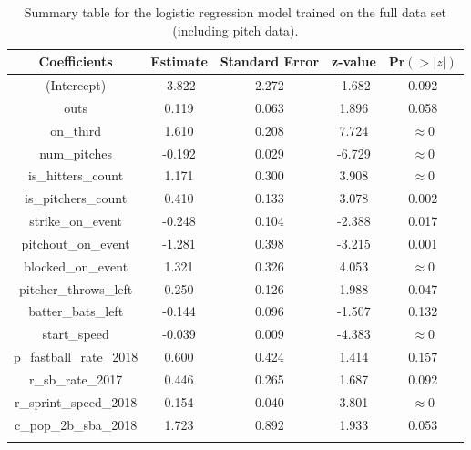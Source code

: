 \documentclass{article}
\begin{document}
\begin{longtable}{c c c c c}
    \hline
    Coefficients & Estimate & Standard Error & z-value & Pr$(>|z|)$ \\
    \hline
    (Intercept) & -3.822 & 2.272 & -1.682 & 0.092 \\
    outs & 0.119 & 0.063 & 1.896 & 0.058 \\
    on\_third & 1.610 & 0.208 & 7.724 & $\approx 0$ \\
    num\_pitches & -0.192 & 0.029 & -6.729 & $\approx 0$ \\
    is\_hitters\_count & 1.171 & 0.300 & 3.908 & $\approx 0$ \\
    is\_pitchers\_count & 0.410 & 0.133 & 3.078 & 0.002 \\
    strike\_on\_event & -0.248 & 0.104 & -2.388 & 0.017 \\
    pitchout\_on\_event & -1.281 & 0.398 & -3.215 & 0.001 \\
    blocked\_on\_event & 1.321 & 0.326 & 4.053 & $\approx 0$ \\
    pitcher\_throws\_left & 0.250 & 0.126 & 1.988 & 0.047 \\
    batter\_bats\_left & -0.144 & 0.096 & -1.507 & 0.132 \\
    start\_speed & -0.039 & 0.009 & -4.383 & $\approx 0$ \\
    p\_fastball\_rate\_2018 & 0.600 & 0.424 & 1.414 & 0.157 \\
    r\_sb\_rate\_2017 & 0.446 & 0.265 & 1.687 & 0.092 \\
    r\_sprint\_speed\_2018 & 0.154 & 0.040 & 3.801 &  $\approx 0$ \\
    c\_pop\_2b\_sba\_2018 & 1.723 & 0.892 & 1.933 & 0.053 \\
    \hline
    \caption{Summary table for the logistic regression model trained on the full data set (including pitch data).}
    \label{tab3_logistic_summary}
\end{longtable}

\vspace{0.5cm}
\end{document}

